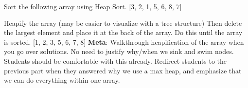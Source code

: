 \question Sort the following array using Heap Sort.
[3, 2, 1, 5, 6, 8, 7]

\begin{solution}[0.75in]
 Heapify the array (may be easier to visualize with a tree structure) \newline 
[3, 2, 1, 5, 6, 8, 7] \newline
[3, 6, 1, 5, 2, 8, 7] \newline
[3, 6, 8, 5, 2, 1, 7] \newline 
[8, 6, 3, 5, 2, 1, 7] \newline 
[8, 6, 7, 5, 2, 1, 3]\newline
Then delete the largest element and place it at the back of the array. Do this until the array is sorted.
[1, 2, 3, 5, 6, 7, 8]
\textbf{Meta}: Walkthrough heapification of the array when you go over solutions. No need to justify why/when we sink and swim nodes. Students should be comfortable with this already. Redirect students to the previous part when they answered why we use a max heap, and emphasize that we can do everything within one array.
\end{solution}